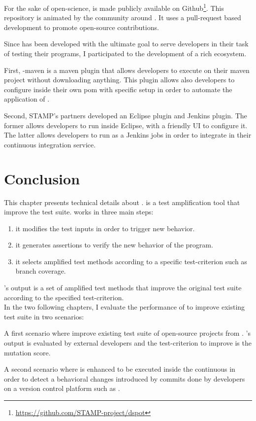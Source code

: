 For the sake of open-science, \dspot is made publicly available on Github\footnote{\url{https://github.com/STAMP-project/dspot}}.
This repository is animated by the community around \dspot.
It uses a pull-request based development to promote open-source contributions.

Since \dspot has been developed with the ultimate goal to serve developers in their task of testing their programs, I participated to the development of a rich ecosystem.

First, \dspot-maven is a maven plugin that allows developers to execute \dspot on their maven project without downloading anything.
This plugin allows also developers to configure \dspot inside their own pom with specific setup in order to automate the application of \dspot.

Second, STAMP's partners developed an Eclipse plugin and Jenkins plugin. 
The former allows developers to run \dspot inside Eclipse, with a friendly UI to configure it. 
The latter allows developers to run \dspot as a Jenkins jobs in order to integrate \dspot in their continuous integration service.

\section{Conclusion}
\label{sec:dspot:conclusion}

This chapter presents technical details about \dspot.
\dspot is a test amplification tool that improve the test suite.
\dspot works in three main steps:
\begin{enumerate}
	\item it modifies the test inputs in order to trigger new behavior.
	\item it generates assertions to verify the new behavior of the program.
	\item it selects amplified test methods according to a specific test-criterion such as branch coverage.
\end{enumerate}

\dspot's output is a set of amplified test methods that improve the original test suite according to the specified test-criterion.\\

In the two following chapters, I evaluate the performance of \dspot to improve existing test suite in two scenarios:

A first scenario where \dspot improve existing test suite of open-source projects from \gh.
\dspot's output is evaluated by external developers and the test-criterion to improve is the mutation score.

A second scenario where \dspot is enhanced to be executed inside the continuous in order to detect a behavioral changes introduced by commits done by developers on a version control platform such as \gh.